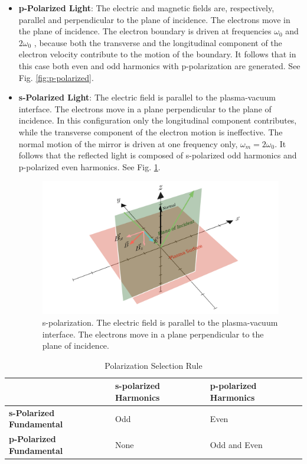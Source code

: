 \documentclass[12pt]{article}
\begin{document}
\begin{itemize}
    \item \textbf{p-Polarized Light}: The electric and magnetic fields are, respectively, parallel and perpendicular to the plane of incidence. The electrons move in the plane of incidence. The electron boundary is driven at frequencies $\omega_0$ and $2\omega_0$ , because both the transverse and the longitudinal component of the electron velocity contribute to the motion of the boundary. It follows that in this case both even and odd harmonics with p-polarization are generated. See Fig. \ref{fig:p-polarized}.
    \item \textbf{s-Polarized Light}: The electric field is parallel to the plasma-vacuum interface. The electrons move in a plane perpendicular to the plane of incidence. In this configuration only the longitudinal component contributes, while the transverse component of the electron motion is ineffective. The normal motion of the mirror is driven at one frequency only, $\omega_m = 2\omega_0$. It follows that the reflected light is composed of s-polarized odd harmonics and p-polarized even harmonics. See Fig. \ref{fig:s-polarized}.
          \begin{figure}[h]
              \centering
              \includegraphics[width=1\textwidth]{images/s.png}
              \caption{s-polarization. The electric field is parallel to the plasma-vacuum interface. The electrons move in a plane perpendicular to the plane of incidence.}
              \label{fig:s-polarized}
          \end{figure}
\end{itemize}

\begin{table}[h]
    \centering
    \caption{Polarization Selection Rule}
    \vspace{0.5cm}
    \label{tab:selection-rule}
    \begin{tabular}{|l|l|l|}
        \hline
                                         & \textbf{s-polarized Harmonics} & \textbf{p-polarized Harmonics} \\ \hline
        \textbf{s-Polarized Fundamental} & Odd                            & Even                           \\ \hline
        \textbf{p-Polarized Fundamental} & None                           & Odd and Even                   \\ \hline
    \end{tabular}
\end{table}
\end{document}
